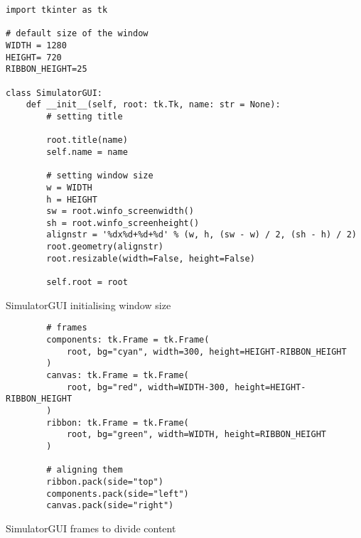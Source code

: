 
\newpage
\begin{listing}[!ht]
    \begin{verbatim}
import tkinter as tk

# default size of the window
WIDTH = 1280
HEIGHT= 720
RIBBON_HEIGHT=25

class SimulatorGUI:
    def __init__(self, root: tk.Tk, name: str = None):
        # setting title
        
        root.title(name)
        self.name = name

        # setting window size
        w = WIDTH
        h = HEIGHT
        sw = root.winfo_screenwidth()
        sh = root.winfo_screenheight()
        alignstr = '%dx%d+%d+%d' % (w, h, (sw - w) / 2, (sh - h) / 2)
        root.geometry(alignstr)
        root.resizable(width=False, height=False)
        
        self.root = root
    \end{verbatim}
    \caption{SimulatorGUI initialising window size}
    \label{sc:simgui-init}
\end{listing}

\newpage
\begin{listing}[!ht]
    \begin{verbatim}
        # frames
        components: tk.Frame = tk.Frame(
            root, bg="cyan", width=300, height=HEIGHT-RIBBON_HEIGHT
        )
        canvas: tk.Frame = tk.Frame(
            root, bg="red", width=WIDTH-300, height=HEIGHT-RIBBON_HEIGHT
        )
        ribbon: tk.Frame = tk.Frame(
            root, bg="green", width=WIDTH, height=RIBBON_HEIGHT
        )
        
        # aligning them
        ribbon.pack(side="top")
        components.pack(side="left")
        canvas.pack(side="right")
    \end{verbatim}
    \caption{SimulatorGUI frames to divide content}
    \label{sc:simgui-frames-example}
\end{listing}

